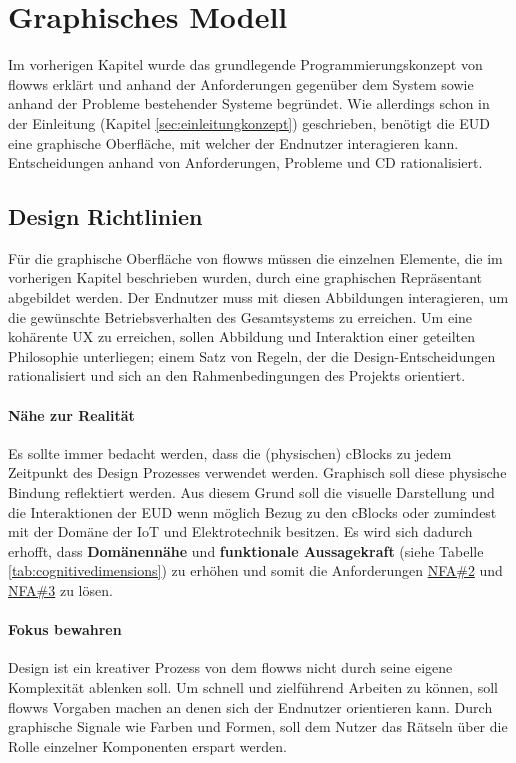 \section{Graphisches Modell}\label{sec:graphischesmodell}
Im vorherigen Kapitel wurde das grundlegende Programmierungskonzept von flowws erklärt und anhand der Anforderungen gegenüber dem System sowie anhand der Probleme bestehender Systeme begründet. Wie allerdings schon in der Einleitung (Kapitel \ref{sec:einleitungkonzept}) geschrieben, benötigt die \ac{EUD} eine graphische Oberfläche, mit welcher der Endnutzer interagieren kann. Entscheidungen anhand von Anforderungen, Probleme und \ac{CD} rationalisiert.
 
\subsection{Design Richtlinien}
Für die graphische Oberfläche von flowws müssen die einzelnen Elemente, die im vorherigen Kapitel beschrieben wurden, durch eine graphischen Repräsentant abgebildet werden. Der Endnutzer muss mit diesen Abbildungen interagieren, um die gewünschte Betriebsverhalten des Gesamtsystems zu erreichen. Um eine kohärente \ac{UX} zu erreichen, sollen Abbildung und Interaktion einer geteilten Philosophie unterliegen; einem Satz von Regeln, der die Design-Entscheidungen rationalisiert und sich an den Rahmenbedingungen des Projekts orientiert.

\paragraph{Nähe zur Realität}\label{par:naehezurrealitaet} Es sollte immer bedacht werden, dass die (physischen) cBlocks zu jedem Zeitpunkt des Design Prozesses verwendet werden. Graphisch soll diese physische Bindung reflektiert werden. Aus diesem Grund soll die visuelle Darstellung und die Interaktionen der \ac{EUD} wenn möglich Bezug zu den cBlocks oder zumindest mit der Domäne der \ac{IoT} und Elektrotechnik besitzen. Es wird sich dadurch erhofft, dass \textbf{Domänennähe} und \textbf{funktionale Aussagekraft} (siehe Tabelle \ref{tab:cognitivedimensions}) zu erhöhen und somit die Anforderungen \hyperref[tab:NFA2]{NFA\#2} und  \hyperref[tab:NFA3]{NFA\#3} zu lösen.

\paragraph{Fokus bewahren}\label{par:fokusbewahren} Design ist ein kreativer Prozess von dem flowws nicht durch seine eigene Komplexität ablenken soll. Um schnell und zielführend Arbeiten zu können, soll flowws Vorgaben machen an denen sich der Endnutzer orientieren kann. Durch graphische Signale wie Farben und Formen, soll dem Nutzer das Rätseln über die Rolle einzelner Komponenten erspart werden.

